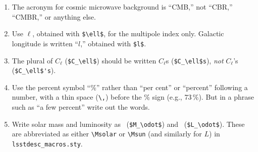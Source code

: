 \documentclass[letterpaper,11pt]{article}
\begin{document}
\begin{enumerate}

\item The acronym for cosmic microwave background is ``CMB,'' not ``CBR,''
``CMBR,'' or anything else.

\item Use $\ell$, obtained with \verb|$\ell$|, for the multipole index only.
Galactic longitude is written ``$l$,'' obtained with \verb|$l$|.

\item The plural of $C_\ell$ (\verb|$C_\ell$|) should be written $C_\ell$s
(\verb|$C_\ell$s|), {\it not\/} $C_\ell$'s (\verb|$C_\ell$'s|).
 



\item Use the percent symbol ``\%'' rather than ``per cent'' or ``percent''
following a number, with a thin space (\verb|\,|) before the \% sign (e.g., 73\,\%).
But in a phrase such as ``a few percent'' write out the words. 

\item Write solar mass and luminosity as \Msolar\ (\verb|$M_\odot$|) and \Lsolar\ (\verb|$L_\odot$|). These are abbreviated as either \verb|\Msolar| or \verb|\Msun| (and similarly for $L$) in {\tt lsstdesc\_macros.sty}.



\end{enumerate}
\end{document}

